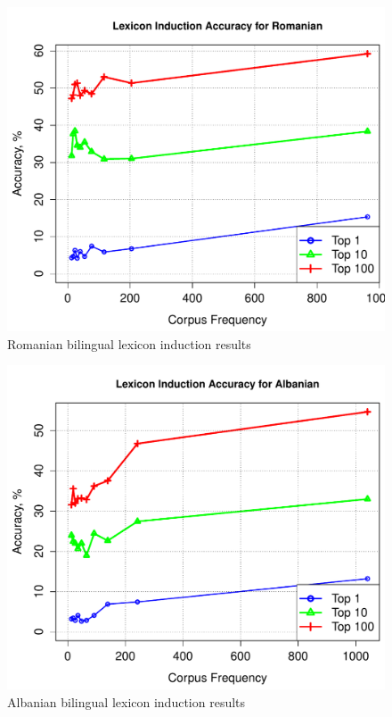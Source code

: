 \documentclass[11pt]{article}
\begin{document}
\begin{figure}
\begin{center}
\includegraphics[width=0.9 \linewidth]{../byFreqGraphs/ro/lexinductnew.pdf}
\vskip -0.15in
\caption{Romanian bilingual lexicon induction results}
\label{fig:bli.ro} 
\end{center}
\end{figure}



\begin{figure}
\begin{center}
\includegraphics[width=0.9 \linewidth]{../byFreqGraphs/sq/lexinductnew.pdf}
\vskip -0.15in
\caption{Albanian bilingual lexicon induction results}
\label{fig:bli.sq} 
\end{center}
\end{figure}
\end{document}
